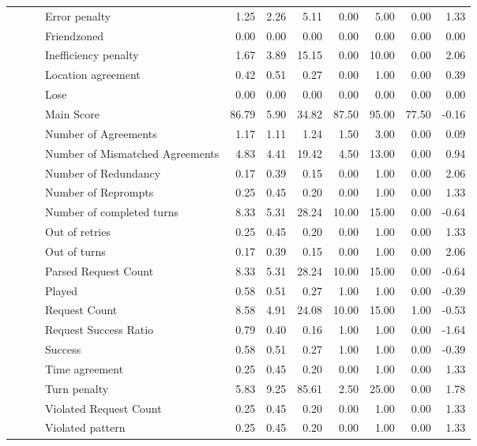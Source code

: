 \begin{tabular}{llllrrrrrrr}
 &  &  & Error penalty & 1.25 & 2.26 & 5.11 & 0.00 & 5.00 & 0.00 & 1.33 \\
 &  &  & Friendzoned & 0.00 & 0.00 & 0.00 & 0.00 & 0.00 & 0.00 & 0.00 \\
 &  &  & Inefficiency penalty & 1.67 & 3.89 & 15.15 & 0.00 & 10.00 & 0.00 & 2.06 \\
 &  &  & Location agreement & 0.42 & 0.51 & 0.27 & 0.00 & 1.00 & 0.00 & 0.39 \\
 &  &  & Lose & 0.00 & 0.00 & 0.00 & 0.00 & 0.00 & 0.00 & 0.00 \\
 &  &  & Main Score & 86.79 & 5.90 & 34.82 & 87.50 & 95.00 & 77.50 & -0.16 \\
 &  &  & Number of Agreements & 1.17 & 1.11 & 1.24 & 1.50 & 3.00 & 0.00 & 0.09 \\
 &  &  & Number of Mismatched Agreements & 4.83 & 4.41 & 19.42 & 4.50 & 13.00 & 0.00 & 0.94 \\
 &  &  & Number of Redundancy & 0.17 & 0.39 & 0.15 & 0.00 & 1.00 & 0.00 & 2.06 \\
 &  &  & Number of Reprompts & 0.25 & 0.45 & 0.20 & 0.00 & 1.00 & 0.00 & 1.33 \\
 &  &  & Number of completed turns & 8.33 & 5.31 & 28.24 & 10.00 & 15.00 & 0.00 & -0.64 \\
 &  &  & Out of retries & 0.25 & 0.45 & 0.20 & 0.00 & 1.00 & 0.00 & 1.33 \\
 &  &  & Out of turns & 0.17 & 0.39 & 0.15 & 0.00 & 1.00 & 0.00 & 2.06 \\
 &  &  & Parsed Request Count & 8.33 & 5.31 & 28.24 & 10.00 & 15.00 & 0.00 & -0.64 \\
 &  &  & Played & 0.58 & 0.51 & 0.27 & 1.00 & 1.00 & 0.00 & -0.39 \\
 &  &  & Request Count & 8.58 & 4.91 & 24.08 & 10.00 & 15.00 & 1.00 & -0.53 \\
 &  &  & Request Success Ratio & 0.79 & 0.40 & 0.16 & 1.00 & 1.00 & 0.00 & -1.64 \\
 &  &  & Success & 0.58 & 0.51 & 0.27 & 1.00 & 1.00 & 0.00 & -0.39 \\
 &  &  & Time agreement & 0.25 & 0.45 & 0.20 & 0.00 & 1.00 & 0.00 & 1.33 \\
 &  &  & Turn penalty & 5.83 & 9.25 & 85.61 & 2.50 & 25.00 & 0.00 & 1.78 \\
 &  &  & Violated Request Count & 0.25 & 0.45 & 0.20 & 0.00 & 1.00 & 0.00 & 1.33 \\
 &  &  & Violated pattern & 0.25 & 0.45 & 0.20 & 0.00 & 1.00 & 0.00 & 1.33 \\

\end{tabular}
